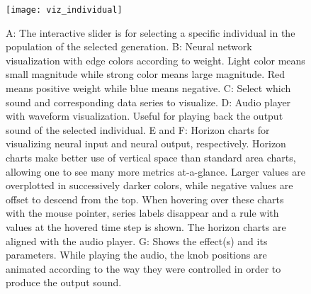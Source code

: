 \begin{figure}[h]
    \centering
    \texttt{[image: viz\_individual]}
    \caption{A: The interactive slider is for selecting a specific individual in the population of the selected generation. B: Neural network visualization with edge colors according to weight. Light color means small magnitude while strong color means large magnitude. Red means positive weight while blue means negative. C: Select which sound and corresponding data series to visualize. D: Audio player with waveform visualization. Useful for playing back the output sound of the selected individual. E and F: Horizon charts for visualizing neural input and neural output, respectively. Horizon charts make better use of vertical space than standard area charts, allowing one to see many more metrics at-a-glance. Larger values are overplotted in successively darker colors, while negative values are offset to descend from the top. When hovering over these charts with the mouse pointer, series labels disappear and a rule with values at the hovered time step is shown. The horizon charts are aligned with the audio player. G: Shows the effect(s) and its parameters. While playing the audio, the knob positions are animated according to the way they were controlled in order to produce the output sound.}
    \label{fig:viz_individual}
\end{figure}


